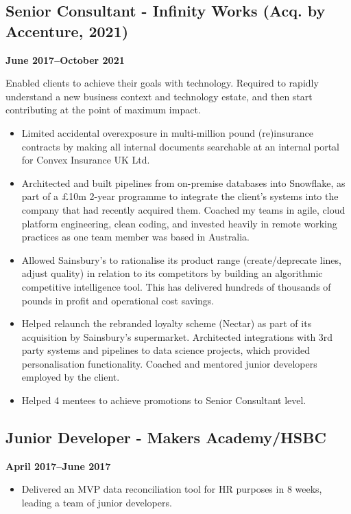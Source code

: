 \documentclass[a4paper]{scrartcl}
\begin{document}
\subsection*{Senior Consultant - Infinity Works (Acq. by Accenture, 2021)}
\textbf{June 2017--October 2021}

Enabled clients to achieve their goals with technology. Required to rapidly understand a new business context and technology estate, and then start contributing at the point of maximum impact.
\begin{itemize}
	\item Limited accidental overexposure in multi-million pound
	      (re)insurance contracts by making
	      all internal documents searchable at an internal portal for Convex
	      Insurance UK Ltd.
	\item Architected and built pipelines from on-premise databases into
	      Snowflake, as part of a £10m 2-year programme to integrate the
	      client's systems into the company that had recently acquired them.
	      Coached my teams in agile, cloud platform engineering, clean
	      coding,
	      and invested heavily in remote working practices as one team member
	      was based
	      in Australia.
	\item Allowed Sainsbury's to rationalise its product range (create/deprecate lines, adjust
	      quality) in relation to its competitors by
	      building an
	      algorithmic competitive intelligence tool. This has delivered
	      hundreds of
	      thousands of pounds in profit and operational cost savings.
	\item Helped relaunch the rebranded loyalty scheme (Nectar) as part of its acquisition by Sainsbury's supermarket. Architected integrations with 3rd party systems
	      and pipelines to data science projects, which provided personalisation functionality. Coached and mentored junior
	      developers
	      employed by the client.
	\item Helped 4 mentees to achieve
	      promotions to Senior Consultant level.
\end{itemize}

\subsection*{Junior Developer - Makers Academy/HSBC}
\textbf{April 2017--June 2017}
\begin{itemize}
	\item Delivered an MVP data reconciliation tool for HR purposes in 8
	      weeks, leading a team of junior developers.
\end{itemize}
\end{document}
